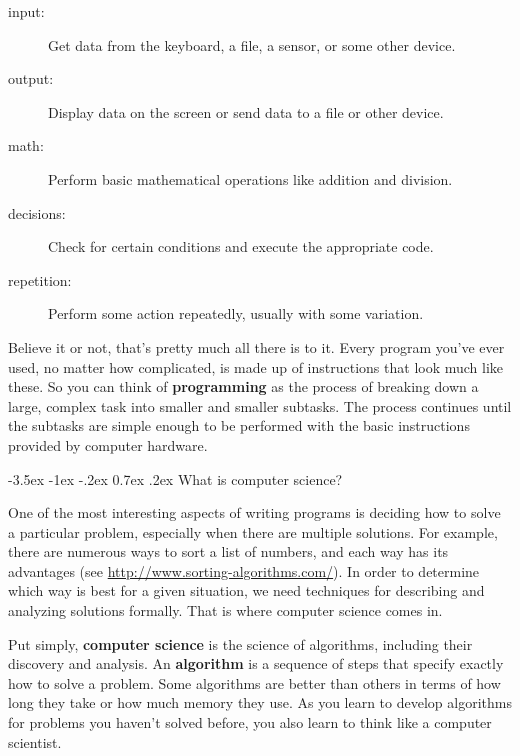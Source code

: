 \documentclass[12pt]{book}
\makeatletter
\theoremstyle{exercise}
\renewcommand{\section}{\@startsection{section}{1}{\z@}%
    {-3.5ex \@plus -1ex \@minus -.2ex}%
    {0.7ex \@plus.2ex}%
    {\normalfont\Large\bfseries}}
\makeatother
\begin{document}
\begin{description}
\item[input:] Get data from the keyboard, a file, a sensor, or some other device.
\item[output:] Display data on the screen or send data to a file or other device.
\item[math:] Perform basic mathematical operations like addition and division.
\item[decisions:] Check for certain conditions and execute the appropriate code.
\item[repetition:] Perform some action repeatedly, usually with some variation.
\end{description}


Believe it or not, that's pretty much all there is to it.
Every program you've ever used, no matter how complicated, is made up of instructions that look much like these.
So you can think of {\bf programming} as the process of breaking down a large, complex task into smaller and smaller subtasks.
The process continues until the subtasks are simple enough to be performed with the basic instructions provided by computer hardware.


\section{What is computer science?}

One of the most interesting aspects of writing programs is deciding how to solve a particular problem, especially when there are multiple solutions.
For example, there are numerous ways to sort a list of numbers, and each way has its advantages (see \url{http://www.sorting-algorithms.com/}).
In order to determine which way is best for a given situation, we need techniques for describing and analyzing solutions formally.
That is where computer science comes in.


Put simply, {\bf computer science} is the science of algorithms, including their discovery and analysis.
An {\bf algorithm} is a sequence of steps that specify exactly how to solve a problem.
Some algorithms are better than others in terms of how long they take or how much memory they use.
As you learn to develop algorithms for problems you haven't solved before, you also learn to think like a computer scientist.
\end{document}
